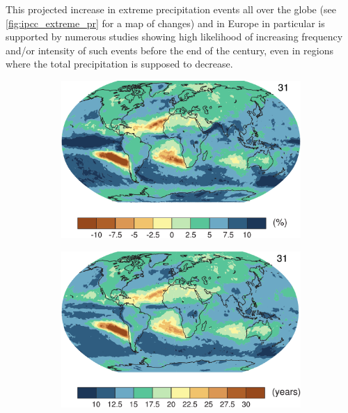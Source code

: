 This projected increase in extreme precipitation events all over the globe (see \cref{fig:ipcc_extreme_pr} for a map of changes) and in Europe in particular is supported by numerous studies \citep[e.g.][]{Christensen2004, Rajczak2013a, Pal2004, Durman2001, KleinTank2003, Fowler2003, Tramblay2018, Goubanova2007, Frei2006a, Pucik2017, Roudier2016, Gobiet2014} showing high likelihood of increasing frequency and/or intensity of such events before the end of the century, even in regions where the total precipitation is supposed to decrease.
\begin{figure}
    \centering
    \begin{subfigure}{.475\textwidth}
        \caption{}\label{fig:ipcc_extreme_pr/a}
        \includegraphics[width=\textwidth]{figures/extreme_pr_change/ipcc_extreme_pr_rp1.png}
    \end{subfigure}
    \begin{subfigure}{.475\textwidth}
        \caption{}\label{fig:ipcc_extreme_pr/b}
        \includegraphics[width=\textwidth]{figures/extreme_pr_change/ipcc_extreme_pr_rp2.png}

\end{subfigure}
\end{figure}
